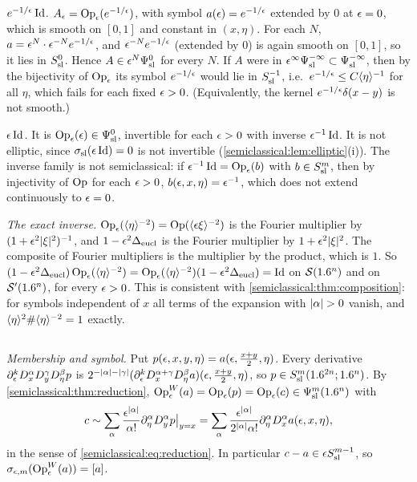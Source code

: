 \subsection*{}
\emph{$e^{-1/\epsilon}\operatorname{Id}$.} $A_\epsilon=\operatorname{Op}_\epsilon(e^{-1/\epsilon})$, with symbol $a(\epsilon)=e^{-1/\epsilon}$ extended by $0$ at
$\epsilon=0$, which is smooth on $[0,1]$ and constant in $(x,\eta)$. For each $N$,
$a=\epsilon^N\cdot\epsilon^{-N}e^{-1/\epsilon}$, and $\epsilon^{-N}e^{-1/\epsilon}$ (extended by $0$) is again smooth on $[0,1]$, so
it lies in $S^{0}_{\mathrm{sl}}$. Hence $A\in\epsilon^N\Psi^{0}_{\mathrm{sl}}$ for every $N$. If $A$ were in
$\epsilon^\infty\Psi^{-\infty}_{\mathrm{sl}}\subset\Psi^{-\infty}_{\mathrm{sl}}$, then by the bijectivity of $\operatorname{Op}_\epsilon$ its symbol
$e^{-1/\epsilon}$ would lie in $S^{-1}_{\mathrm{sl}}$, i.e.\ $e^{-1/\epsilon}\le C\langle \eta\rangle^{-1}$ for all $\eta$, which fails
for each fixed $\epsilon>0$. (Equivalently, the kernel $e^{-1/\epsilon}\delta(x-y)$ is not smooth.)

\emph{$\epsilon\operatorname{Id}$.} It is $\operatorname{Op}_\epsilon(\epsilon)\in\Psi^{0}_{\mathrm{sl}}$, invertible for each $\epsilon>0$ with inverse
$\epsilon^{-1}\operatorname{Id}$. It is not elliptic, since $\sigma_{\mathrm{sl}}(\epsilon\operatorname{Id})=0$ is not invertible
(\cref{semiclassical:lem:elliptic}(i)). The inverse family is not semiclassical: if
$\epsilon^{-1}\operatorname{Id}=\operatorname{Op}_\epsilon(b)$ with $b\in S^{m}_{\mathrm{sl}}$, then by injectivity of $\operatorname{Op}$ for each $\epsilon>0$,
$b(\epsilon,x,\eta)=\epsilon^{-1}$, which does not extend continuously to $\epsilon=0$.

\emph{The exact inverse.} $\operatorname{Op}_\epsilon(\langle \eta\rangle^{-2})=\operatorname{Op}(\langle \epsilon\xi\rangle^{-2})$ is the Fourier multiplier by
$(1+\epsilon^2\lvert \xi\rvert^2)^{-1}$, and $1-\epsilon^2\Delta_{\mathrm{eucl}}$ is the Fourier multiplier by
$1+\epsilon^2\lvert \xi\rvert^2$. The composite of Fourier multipliers is the multiplier by the product,
which is $1$. So $(1-\epsilon^2\Delta_{\mathrm{eucl}})\operatorname{Op}_\epsilon(\langle \eta\rangle^{-2})=\operatorname{Op}_\epsilon(\langle \eta\rangle^{-2})(1-\epsilon^2\Delta_{\mathrm{eucl}})=\operatorname{Id}$
on $\mathcal{S}(1.6^n)$ and on $\mathcal{S}'(1.6^n)$, for every $\epsilon>0$. This is consistent with
\cref{semiclassical:thm:composition}: for symbols independent of $x$ all terms of the
expansion with $\lvert \alpha\rvert>0$ vanish, and $\langle \eta\rangle^2\#\langle \eta\rangle^{-2}=1$ exactly.

\subsection*{}
\emph{Membership and symbol.} Put $p(\epsilon,x,y,\eta)=a(\epsilon,\frac{x+y}2,\eta)$. Every derivative
$\partial^k_\epsilon D^\alpha_xD^\gamma_yD^\beta_\eta p$ is $2^{-\lvert \alpha\rvert-\lvert \gamma\rvert}(\partial^k_\epsilon D^{\alpha+\gamma}_xD^\beta_\eta a)(\epsilon,\frac{x+y}2,\eta)$, so
$p\in S^{m}_{\mathrm{sl}}(1.6^{2n};1.6^n)$. By \cref{semiclassical:thm:reduction},
$\operatorname{Op}^W_\epsilon(a)=\operatorname{Op}_\epsilon(p)=\operatorname{Op}_\epsilon(c)\in\Psi^{m}_{\mathrm{sl}}(1.6^n)$ with
\begin{equation*}
c\sim\sum_\alpha\frac{\epsilon^{\lvert \alpha\rvert}}{\alpha!}\partial^\alpha_\eta D^\alpha_yp\big|_{y=x}
=\sum_\alpha\frac{\epsilon^{\lvert \alpha\rvert}}{2^{\lvert \alpha\rvert}\alpha!}\partial^\alpha_\eta D^\alpha_xa(\epsilon,x,\eta),
\end{equation*}
in the sense of \eqref{semiclassical:eq:reduction}. In particular $c-a\in\epsilon S^{m-1}_{\mathrm{sl}}$, so
$\sigma_{\epsilon,m}(\operatorname{Op}^W_\epsilon(a))=[a]$.

